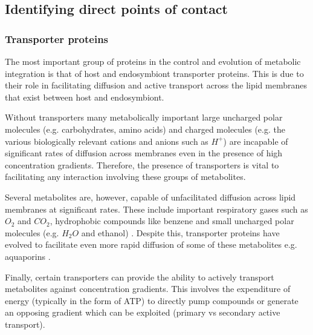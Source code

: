 \subsection{Identifying direct points of contact}

\subsubsection{Transporter proteins}

The most important group of proteins in the control and evolution
of metabolic integration is that of host and endosymbiont transporter proteins.
This is due to their role in facilitating diffusion and active transport
across the lipid membranes that exist between host and endosymbiont.

Without transporters many metabolically important 
large uncharged polar molecules (e.g. carbohydrates, amino acids)
and charged molecules (e.g. the various biologically relevant cations and anions such
as \(H^{+}\)) are incapable of significant rates of diffusion 
across membranes even in the presence of high concentration gradients. 
Therefore, the presence of transporters is vital to facilitating
any interaction involving these groups of metabolites. 


Several metabolites are, however, capable 
of unfacilitated diffusion across lipid membranes at significant rates.
These include important respiratory gases such as \(O_{2}\) and \(CO_2\),
hydrophobic compounds like benzene and small uncharged polar molecules
(e.g. \(H_2O\) and ethanol) \citep{cooper2013the,alberts2015molecular}.  
Despite this, transporter proteins have evolved to facilitate
even more rapid diffusion of some of these metabolites e.g. aquaporins
\citep{Agre1993}.  


Finally, certain transporters can provide the ability
to actively transport metabolites against concentration gradients. 
This involves the expenditure of energy (typically in the form of ATP)
to directly pump compounds or generate an opposing gradient which can be
exploited (primary vs secondary active transport). 

